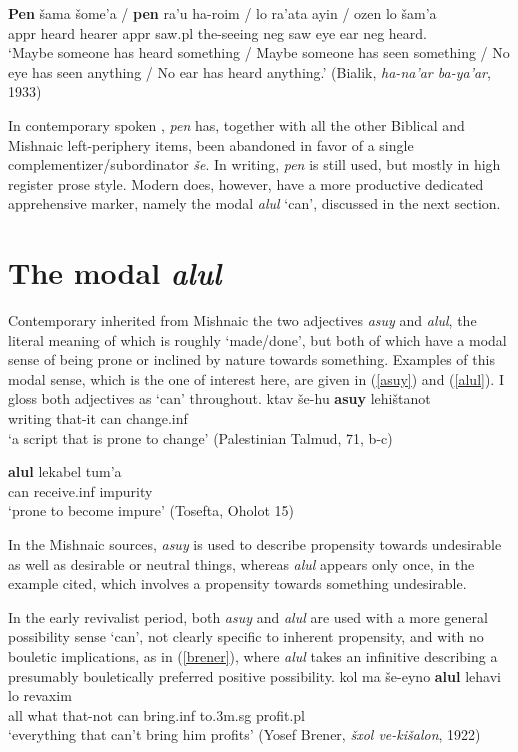 \documentclass[output=paper,colorlinks,citecolor=brown]{langscibook}
\begin{document}
\ea
\label{bialik}
\gll  \textbf{Pen} {šama} šome'a /  \textbf{pen} ra'u ha-roim / lo ra'ata ayin / ozen lo šam'a \\
 {\sc appr} heard hearer \phantom{/} {\sc appr} saw.{\sc pl} the-seeing \phantom{/} {\sc neg} saw eye \phantom{/} ear {\sc neg} heard. \\
\glt  `Maybe someone has heard something / Maybe someone has seen something  / No eye has seen anything / No ear  has heard anything.'  (Bialik, \textit{ha-na'ar ba-ya'ar}, 1933)
\z
 
In contemporary spoken , \textit{pen} has, together with all the other Biblical and Mishnaic left-periphery items, been abandoned in favor of a single complementizer/subordinator \textit{še}. In writing, \textit{pen} is still used, but mostly in high register prose style. Modern   does, however, have a more productive dedicated apprehensive marker, namely the modal \textit{alul} `can', discussed in the next section.

\section{The modal \textit{alul}}
\label{sec:alul}
Contemporary  inherited from Mishnaic  the two adjectives \textit{asuy} and \textit{alul}, the literal meaning of which is roughly `made/done', but both of which have a modal sense of being prone or inclined by nature towards something. Examples of this modal sense, which is the one of interest here, are given in (\ref{asuy}) and (\ref{alul}). I gloss both adjectives as `can' throughout. 
\ea
\label{asuy}
\gll ktav še-hu \textbf{asuy} lehištanot  \\
writing that-it can change.{\sc inf} \\
\glt `a script that is prone to change' (Palestinian Talmud, 71, b-c)
\z

\ea
\label{alul}
\gll \textbf{alul} lekabel tum'a  \\
 can receive.{\sc inf} impurity  \\
\glt `prone to become impure' (Tosefta, Oholot 15)
\z

 In the Mishnaic sources, \textit{asuy} is used to describe propensity towards undesirable as well as desirable or neutral things, whereas \textit{alul} appears only once, in the example cited, which involves a propensity towards something undesirable. 

In the early revivalist period, both \textit{asuy} and \textit{alul} are used with a more general possibility sense `can', not clearly specific to inherent propensity, and with no bouletic implications, as in (\ref{brener}), where \textit{alul} takes an infinitive describing a presumably bouletically preferred positive possibility.  
\ea
\label{brener}
\gll kol ma še-eyno \textbf{alul} lehavi lo revaxim \\
all what that-not can bring.{\sc inf} to.{\sc 3m.sg} profit.{\sc pl} \\
\glt `everything that can't bring him profits' (Yosef Brener, \textit{šxol ve-kišalon}, 1922)
\z
\end{document}
